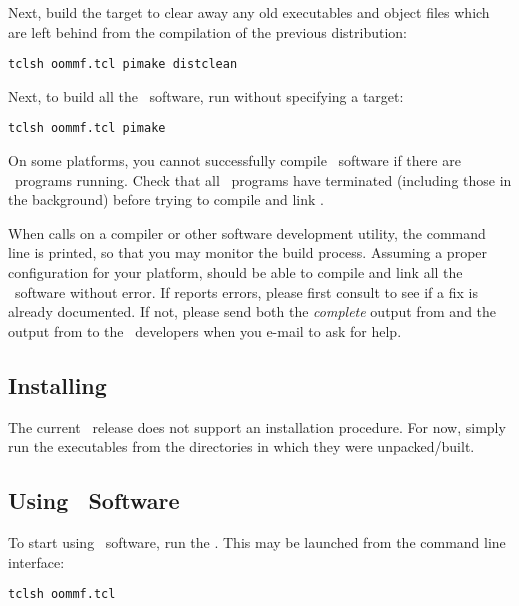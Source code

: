 Next, build the target  to clear away any old executables
and object files which are left behind from the compilation of the
previous distribution:
\begin{verbatim}
tclsh oommf.tcl pimake distclean
\end{verbatim}

Next, to build all the \OOMMF\ software, run  without
specifying a target:
\begin{verbatim}
tclsh oommf.tcl pimake
\end{verbatim}
On some platforms, you cannot successfully compile \OOMMF\ software if
there are \OOMMF\ programs running.  Check that all \OOMMF\ programs
have terminated (including those in the background) before trying to
compile and link \OOMMF.

When  calls on a compiler or other software development
utility, the command line is printed, so that you may monitor the build
process.
Assuming a proper configuration for your platform,  should be
able to compile and link all the \OOMMF\ software without error.  If
 reports errors, please first consult
to see if a fix is already documented.
If not, please send both the {\em complete} output
from  and the output from 
to the \OOMMF\ developers when you e-mail to ask for help.

\subsection{Installing}\label{sec:install.installing}
The current \OOMMF\ release does not support an installation procedure.
For now, simply run the executables from the directories in which they
were unpacked/built.

\subsection{Using \OOMMF\ Software}\label{sec:install.using}
To start using \OOMMF\ software, run the
. This may be launched from the command
line interface:
\begin{verbatim}
tclsh oommf.tcl
\end{verbatim}

